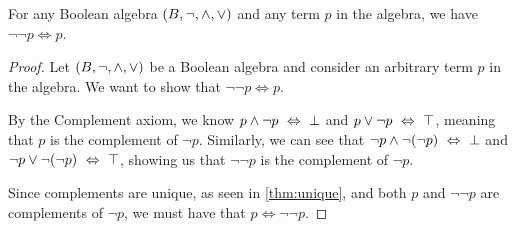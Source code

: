 \newpage

\begin{theorem}
    For any Boolean algebra $(B, \neg, \wedge, \vee)$ and any term $p$ in the algebra,
    we have $\neg \neg p \iff p$.
\end{theorem}
\begin{proof}
    Let $(B, \neg, \wedge, \vee)$ be a Boolean algebra
    and consider an arbitrary term $p$ in the algebra.
    We want to show that $\neg \neg p \iff p$.

    By the Complement axiom, we know $p \wedge \neg p ~\Leftrightarrow~ \bot$ and $p \vee \neg p ~\Leftrightarrow~ \top$,
    meaning that $p$ is the complement of $\neg p$.
    Similarly, we can see that $\neg p \wedge \neg (\neg p) ~\Leftrightarrow~ \bot$ and $\neg p \vee \neg (\neg p) ~\Leftrightarrow~ \top$,
    showing us that $\neg \neg p$ is the complement of $\neg p$.

    Since complements are unique, as seen in \autoref{thm:unique},
    and both $p$ and $\neg \neg p$ are complements of $\neg p$, we must have that $p \iff \neg \neg p$.
\end{proof}

